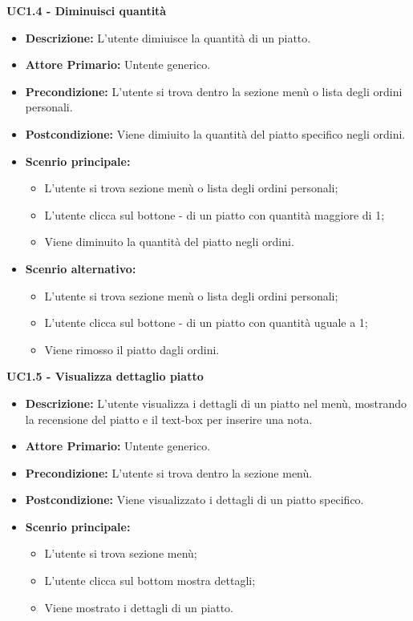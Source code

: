 \textbf{UC1.4 - Diminuisci quantità}
\begin{itemize}
    \item \textbf{Descrizione:} L'utente dimiuisce la quantità di un piatto.
    \item \textbf{Attore Primario:} Untente generico.
    \item \textbf{Precondizione:} L'utente si trova dentro la sezione menù o lista degli ordini personali.
    \item \textbf{Postcondizione:} Viene dimiuito la quantità del piatto specifico negli ordini.
    \item \textbf{Scenrio principale:}
    \begin{itemize}
        \item L'utente si trova sezione menù o lista degli ordini personali;
        \item L'utente clicca sul bottone - di un piatto con quantità maggiore di 1;
        \item Viene diminuito la quantità del piatto negli ordini.
    \end{itemize}
    \item \textbf{Scenrio alternativo:}
    \begin{itemize}
        \item L'utente si trova sezione menù o lista degli ordini personali;
        \item L'utente clicca sul bottone - di un piatto con quantità uguale a 1;
        \item Viene rimosso il piatto dagli ordini.
    \end{itemize}
\end{itemize}
\textbf{UC1.5 - Visualizza dettaglio piatto}
\begin{itemize}
    \item \textbf{Descrizione:} L'utente visualizza i dettagli di un piatto nel menù, mostrando la recensione del piatto e il text-box per inserire una nota.
    \item \textbf{Attore Primario:} Untente generico.
    \item \textbf{Precondizione:} L'utente si trova dentro la sezione menù.
    \item \textbf{Postcondizione:} Viene visualizzato i dettagli di un piatto specifico.
    \item \textbf{Scenrio principale:}  
    \begin{itemize}
        \item L'utente si trova sezione menù;
        \item L'utente clicca sul bottom mostra dettagli;
        \item Viene mostrato i dettagli di un piatto.
    \end{itemize}
\end{itemize}
